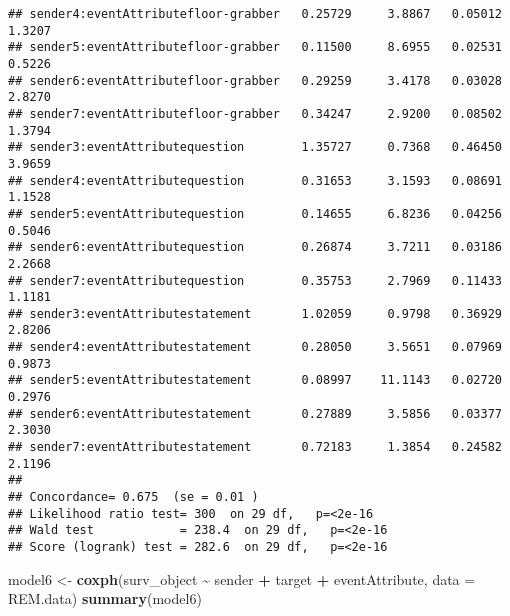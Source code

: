 \documentclass[
]{article}
\newenvironment{Shaded}{\begin{snugshade}}{\end{snugshade}}
\newcommand{\AttributeTok}[1]{\textcolor[rgb]{0.13,0.29,0.53}{#1}}
\newcommand{\FunctionTok}[1]{\textcolor[rgb]{0.13,0.29,0.53}{\textbf{#1}}}
\newcommand{\NormalTok}[1]{#1}
\newcommand{\OtherTok}[1]{\textcolor[rgb]{0.56,0.35,0.01}{#1}}
\newcommand{\SpecialCharTok}[1]{\textcolor[rgb]{0.81,0.36,0.00}{\textbf{#1}}}
\begin{document}
\begin{verbatim}
## sender4:eventAttributefloor-grabber   0.25729     3.8867   0.05012    1.3207
## sender5:eventAttributefloor-grabber   0.11500     8.6955   0.02531    0.5226
## sender6:eventAttributefloor-grabber   0.29259     3.4178   0.03028    2.8270
## sender7:eventAttributefloor-grabber   0.34247     2.9200   0.08502    1.3794
## sender3:eventAttributequestion        1.35727     0.7368   0.46450    3.9659
## sender4:eventAttributequestion        0.31653     3.1593   0.08691    1.1528
## sender5:eventAttributequestion        0.14655     6.8236   0.04256    0.5046
## sender6:eventAttributequestion        0.26874     3.7211   0.03186    2.2668
## sender7:eventAttributequestion        0.35753     2.7969   0.11433    1.1181
## sender3:eventAttributestatement       1.02059     0.9798   0.36929    2.8206
## sender4:eventAttributestatement       0.28050     3.5651   0.07969    0.9873
## sender5:eventAttributestatement       0.08997    11.1143   0.02720    0.2976
## sender6:eventAttributestatement       0.27889     3.5856   0.03377    2.3030
## sender7:eventAttributestatement       0.72183     1.3854   0.24582    2.1196
## 
## Concordance= 0.675  (se = 0.01 )
## Likelihood ratio test= 300  on 29 df,   p=<2e-16
## Wald test            = 238.4  on 29 df,   p=<2e-16
## Score (logrank) test = 282.6  on 29 df,   p=<2e-16
\end{verbatim}

\begin{Shaded}
\begin{Highlighting}[]
\NormalTok{model6 }\OtherTok{\textless{}{-}} \FunctionTok{coxph}\NormalTok{(surv\_object }\SpecialCharTok{\textasciitilde{}}\NormalTok{ sender }\SpecialCharTok{+}\NormalTok{ target }\SpecialCharTok{+}\NormalTok{ eventAttribute, }\AttributeTok{data =}\NormalTok{ REM.data)}
\FunctionTok{summary}\NormalTok{(model6)}
\end{Highlighting}
\end{Shaded}
\end{document}
